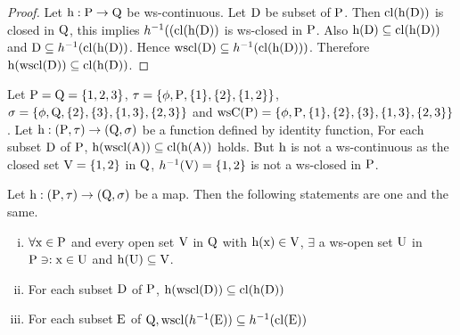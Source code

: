 \begin{proof}
Let $\mathrm{h}: \mathrm{P}\to \mathrm{Q}$ be ws-continuous. Let $\mathrm{D}$ be subset of $\mathrm{P}$. Then $\mathrm{cl}(\mathrm{h}(\mathrm{D}))$ is closed in $\mathrm{Q}$, this implies $h^{-1}((\mathrm{cl}(\mathrm{h}(\mathrm{D}))$ is ws-closed in $\mathrm{P}$. Also $\mathrm{h}(\mathrm{D})\subseteq \mathrm{cl}(\mathrm{h}(\mathrm{D}))$ and $\mathrm{D}\subseteq h^{-1}(\mathrm{cl}(\mathrm{h}(\mathrm{D}))$. Hence $\mathrm{wscl}(\mathrm{D})\subseteq h^{-1}(\mathrm{cl}(\mathrm{h}(\mathrm{D})))$. Therefore $\mathrm{h}(\mathrm{wscl}(\mathrm{D}))\subseteq \mathrm{cl}(\mathrm{h}(\mathrm{D}))$.
\end{proof}

\begin{exm}\label{exam3.2.8}
Let $\mathrm{P}=\mathrm{Q}=\{1,2,3\}$, $\tau =\{\phi, \mathrm{P},\{1\},\{2\},\{1, 2\}\}$, $\sigma =\{\phi, \TSQ, \{2\},\break \{3\}, \{1, 3\}, \{2, 3\}\}$ and $\mathrm{ws}\mathrm{C}(\mathrm{P})= \{\phi, \mathrm{P}, \{1\},\{2\},\{3\}, \{1, 3\},\{2, 3\}\}$. Let $\mathrm{h}: (\mathrm{P},\tau )\to (\mathrm{Q}, \sigma)$ be a function defined by identity function, For each subset $\mathrm{D}$ of $\mathrm{P}$, $\mathrm{h}(\mathrm{wscl}(\mathrm{A}))\subseteq \mathrm{cl}(\mathrm{h}(\mathrm{A}))$ holds. But $\mathrm{h}$ is not a ws-continuous as the closed set $\mathrm{V}= \{1, 2\}$ in $\mathrm{Q}$, $h^{-1}(\mathrm{V}) = \{1, 2\}$ is not a ws-closed in $\mathrm{P}$.
\end{exm}

\begin{thm}\label{thm3.2.8}
Let $\mathrm{h}: (\mathrm{P},\tau )\to (\mathrm{Q}, \sigma)$ be a map. Then the following statements are one and the same.
\begin{enumerate}[(i)]
\item $\forall \mathrm{x}\in \mathrm{P}$ and every open set $\mathrm{V}$ in $\mathrm{Q}$ with $\mathrm{h}(\mathrm{x})\in \mathrm{V}$, $\exists$ a ws-open set $\mathrm{U}$ in $\mathrm{P}\ni: \mathrm{x}\in\mathrm{U}$ and $\mathrm{h}(\mathrm{U})\subseteq \mathrm{V}$.
\item For each subset $\mathrm{D}$ of $\mathrm{P}$, $\mathrm{h}(\mathrm{wscl}(\mathrm{D}))\subseteq \mathrm{cl}(\mathrm{h}(\mathrm{D}))$
\item For each subset $\mathrm{E}$ of $\mathrm{Q}, \mathrm{wscl}(h^{-1} (\mathrm{E})) \subseteq  h^{-1}(\mathrm{cl}(\mathrm{E}))$
\end{enumerate}
\end{thm}

